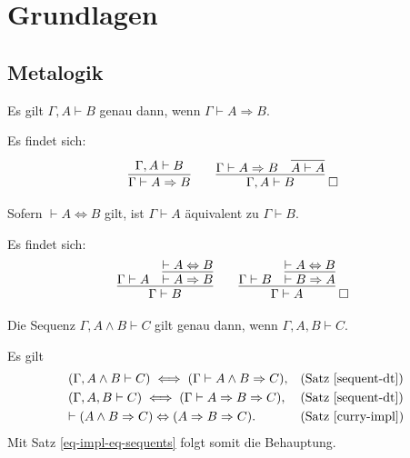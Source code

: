 
\chapter{Grundlagen}
\section{Metalogik}
\begin{Satz}\label{sequent-dt}\newlinefirst
Es gilt $\Gamma,A\vdash B$ genau dann, wenn $\Gamma\vdash A\Rightarrow B$.
\end{Satz}
\begin{Beweis} Es findet sich:
\[\begin{array}{@{}l@{\qquad}l}
\infer{\Gamma\vdash A\Rightarrow B}{\Gamma,A\vdash B}
&
\infer{\Gamma,A\vdash B}{\Gamma\vdash A\Rightarrow B & \infer{A\vdash A}{}}
\;\qedsymbol
\end{array}
\]
\end{Beweis}

\begin{Satz}\label{eq-impl-eq-sequents}
Sofern $\vdash A\Leftrightarrow B$ gilt,
ist $\Gamma\vdash A$ äquivalent zu $\Gamma\vdash B$.
\end{Satz}
\begin{Beweis} Es findet sich:
\[\begin{array}{@{}l@{\qquad}l}
\infer{\Gamma\vdash B}{\Gamma\vdash A &
  \infer{\vdash A\Rightarrow B}{\vdash A\Leftrightarrow B}}
&
\infer{\Gamma\vdash A}{\Gamma\vdash B &
  \infer{\vdash B\Rightarrow A}{\vdash A\Leftrightarrow B}}\;\qedsymbol
\end{array}
\]
\end{Beweis}

\begin{Satz}
Die Sequenz $\Gamma, A\land B\vdash C$ gilt genau dann, wenn $\Gamma,A,B\vdash C$.
\end{Satz}
\begin{Beweis}
Es gilt
\begin{align*}
& (\Gamma, A\land B\vdash C)\iff (\Gamma\vdash A\land B\Rightarrow C),
  &&\text{(Satz \ref{sequent-dt})}\\
& (\Gamma,A,B\vdash C)\iff (\Gamma\vdash A\Rightarrow B\Rightarrow C),
  &&\text{(Satz \ref{sequent-dt})}\\
& {\vdash (A\land B\Rightarrow C)\Leftrightarrow (A\Rightarrow B\Rightarrow C)}.
  &&\text{(Satz \ref{curry-impl})}
\end{align*}
Mit Satz \ref{eq-impl-eq-sequents} folgt somit die Behauptung.\,\qedsymbol
\end{Beweis}

